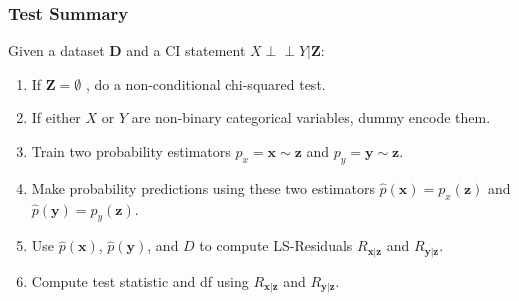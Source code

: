 \documentclass{beamer}
\def\ci{\perp\!\!\!\!\!\perp}
\begin{document}
\begin{frame}
	\frametitle{Test Summary}
	Given a dataset $ \mathbf{D} $ and a CI statement $ X \ci Y | \bm{Z} $:
	\vspace{1em}
	\begin{enumerate}
		\setlength\itemsep{1em}
		\item If $\mathbf{Z} = \emptyset $ , do a non-conditional chi-squared test.
		\item If either $ X $ or $ Y $ are non-binary categorical variables,
			dummy encode them.
		\item Train two probability estimators $ p_x = \bm{x} \sim \bm{z} $ and
			$ p_y = \bm{y} \sim \bm{z} $.
		\item Make probability predictions using these two estimators 
			$ \hat{p}(\bm{x}) = p_x(\bm{z}) $ and $ \hat{p}(\bm{y}) = p_y(\bm{\bm{z}}) $.
		\item Use $ \hat{p}(\bm{x}) $, $ \hat{p}(\bm{y}) $, and $ D $ to compute LS-Residuals $ R_{\bm{x}|\bm{z}} $ and $ R_{\bm{y}|\bm{z}} $.	
		\item Compute test statistic and df using $ R_{\bm{x}|\bm{z}} $ and $ R_{\bm{y}|\bm{z}} $.
	\end{enumerate}
\end{frame}
% 
% 
% 
\end{document}
